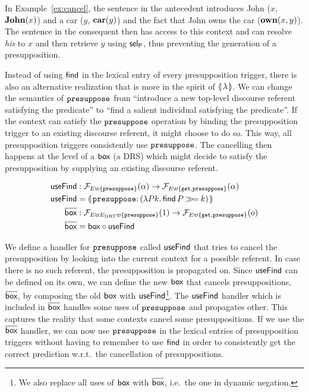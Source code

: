 In Example~\ref{ex:cancel}, the sentence in the antecedent introduces John
($x$, $\textbf{John}(x)$) and a car ($y$, $\textbf{car}(y)$) and the fact that
John owns the car ($\textbf{own}(x, y)$). The sentence in the consequent then
has access to this context and can resolve \emph{his} to $x$ and then
retrieve $y$ using $\textsf{sel}_{\textsf{P}}$, thus preventing the generation of a
presupposition.

Instead of using $\textsf{find}$ in the lexical entry of every presupposition
trigger, there is also an alternative realization that is more in the
spirit of $\llparenthesis \, \lambda \, \rrparenthesis$. We can change the semantics of
$\mathtt{presuppose}$ from ``introduce a new top-level discourse referent
satisfying the predicate'' to ``find a salient individual satisfying the
predicate''. If the context can satisfy the $\mathtt{presuppose}$ operation by
binding the presupposition trigger to an existing discourse referent, it
might choose to do so. This way, all presupposition triggers consistently
use $\mathtt{presuppose}$. The cancelling then happens at the level of a $\textsf{box}$
(a DRS) which might decide to satisfy the presupposition by supplying an
existing discourse referent.

\begin{align*}
  \useFind &: \FF_{E \uplus \{\op{presuppose}\}}(\alpha) \to \FF_{E \uplus \{\op{get}, \op{presuppose}\}}(\alpha) \\
  \useFind &= \banana{\onto{\op{presuppose}}{(\lam{P k}{\ap{\find}{P} \hsbind k})}} \\
  \DBOX &: \FF_{E \uplus E_\DRT \uplus \{\op{presuppose}\}}(1) \to \FF_{E \uplus \{\op{get}, \op{presuppose}\}}(o) \\
  \DBOX &= \BOX \circ \useFind
\end{align*}

We define a handler for $\mathtt{presuppose}$ called $\textsf{useFind}$ that tries to
cancel the presupposition by looking into the current context for a
possible referent. In case there is no such referent, the presupposition is
propagated on. Since $\textsf{useFind}$ can be defined on its own, we can define
the new $\textsf{box}$ that cancels presuppositions, $\overline{\textsf{box}}$, by composing the old
$\textsf{box}$ with $\textsf{useFind}$\footnote{We also replace all uses of $\textsf{box}$ with
  $\overline{\textsf{box}}$, i.e.\ the one in dynamic negation.}. The $\textsf{useFind}$ handler
which is included in $\overline{\textsf{box}}$ handles some uses of $\mathtt{presuppose}$ and
propagates other. This captures the reality that some contexts cancel some
presuppositions. If we use the $\overline{\textsf{box}}$ handler, we can now use
$\mathtt{presuppose}$ in the lexical entries of presupposition triggers without
having to remember to use $\textsf{find}$ in order to consistently get the correct
prediction w.r.t.\ the cancellation of presuppositions.

